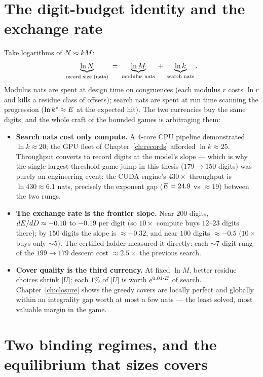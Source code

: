 \section{The digit-budget identity and the exchange rate}\label{sec:budget}

Take logarithms of $N\approx kM$:
\[
\underbrace{\ln N}_{\text{record size (nats)}}
\;=\;
\underbrace{\ln M}_{\text{modulus nats}}
\;+\;
\underbrace{\ln k}_{\text{search nats}}.
\]
Modulus nats are spent at design time on congruences (each modulus $r$
costs $\ln r$ and kills a residue class of offsets); search nats are
spent at run time scanning the progression ($\ln k^*\approx E$ at the
expected hit). The two currencies buy the same digits, and the whole
craft of the bounded games is arbitraging them:

\begin{itemize}
\item \textbf{Search nats cost only compute.} A 4-core CPU pipeline
demonstrated $\ln k\approx20$; the GPU fleet of
Chapter~\ref{ch:records} afforded $\ln k\approx25$. Throughput converts
to record digits at the model's slope --- which is why the single
largest threshold-game jump in this thesis ($179\to150$ digits) was
purely an engineering event: the CUDA engine's $430\times$ throughput is
$\ln430\approx6.1$ nats, precisely the exponent gap ($E=24.9$ vs
$\approx19$) between the two rungs.
\item \textbf{The exchange rate is the frontier slope.} Near $200$
digits, $dE/dD\approx-0.10$ to $-0.19$ per digit (so $10\times$
compute buys $12$--$23$ digits there); by $150$ digits the slope is
$\approx-0.32$, and near $100$ digits $\approx-0.5$ ($10\times$ buys
only $\sim5$). The certified ladder measured it directly: each
$\sim7$-digit rung of the $199\to179$ descent cost $\approx2.5\times$
the previous search.
\item \textbf{Cover quality is the third currency.} At fixed $\ln M$,
better residue choices shrink $|U|$; each $1\%$ of $|U|$ is worth
$e^{0.01\cdot E}$ of search. Chapter~\ref{ch:closure} shows the greedy
covers are locally perfect and globally within an integrality gap worth
at most a few nats --- the least solved, most valuable margin in the
game.
\end{itemize}

\section{Two binding regimes, and the equilibrium that sizes covers}\label{sec:regimes}


